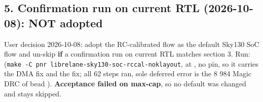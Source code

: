 \subsection{5. Confirmation run on current RTL (2026-10-08): NOT
adopted}\label{cr:defect:sky130-slew-cap-e45j:5-confirmation-run-on-current-rtl-2026-10-08-not-adopted}

\begin{record}

User decision 2026-10-08: adopt the RC-calibrated flow as the default
Sky130 SoC flow and un-skip  \textbf{if}
a confirmation run on current  RTL matches section 3. Run:
(\texttt{make\ -\allowbreak{}C\ pnr\ librelane-\allowbreak{}sky130-\allowbreak{}soc-\allowbreak{}rccal-\allowbreak{}noklayout},
 at , no  pin, so it
carries the  DMA fix and the 
 fix; all 62 steps ran, sole deferred error
is the 8 984 Magic DRC of bead ). \textbf{Acceptance failed on
max-cap}, so no default was changed and 
stays skipped.

{\small\setlength{\tabcolsep}{4pt}

}
\end{record}
